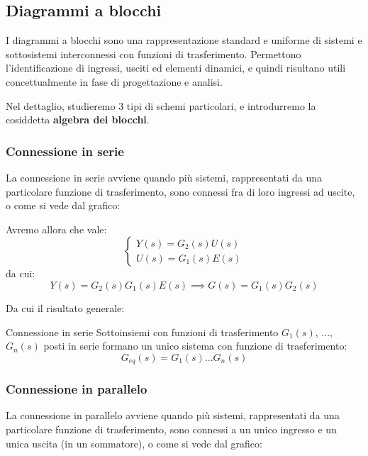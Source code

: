 \documentclass[a4paper,11pt]{article}
\begin{document}
\subsection{Diagrammi a blocchi}
I diagrammi a blocchi sono una rappresentazione standard e uniforme di sistemi e sottosistemi interconnessi con funzioni di trasferimento.
Permettono l'identificazione di ingressi, usciti ed elementi dinamici, e quindi risultano utili concettualmente in fase di progettazione e analisi.

Nel dettaglio, studieremo 3 tipi di schemi particolari, e introdurremo la cosiddetta \textbf{algebra dei blocchi}.

\subsubsection{Connessione in serie}
La connessione in serie avviene quando più sistemi, rappresentati da una particolare funzione di trasferimento, sono connessi fra di loro ingressi ad uscite, o come si vede dal grafico:

\begin{center}
\end{center}

Avremo allora che vale:
\[
	\begin{cases}
	Y(s) = G_2(s) U(s) \\
	U(s) = G_1(s) E(s)
	\end{cases}
\]
da cui:
$$
Y(s) = G_2(s)G_1(s)E(s) \implies G(s) = G_1(s) G_2(s)
$$

Da cui il risultato generale:
\begin{theorem}{Connessione in serie}
	Sottoinsiemi con funzioni di trasferimento $G_1(s)$, $...$, $G_n(s)$ posti in serie formano un unico sistema con funzione di trasferimento:
	$$
		G_{eq}(s) = G_1(s) ... G_n(s)
	$$
\end{theorem}

\subsubsection{Connessione in parallelo}
La connessione in parallelo avviene quando più sistemi, rappresentati da una particolare funzione di trasferimento, sono connessi a un unico ingresso e un unica uscita (in un sommatore), o come si vede dal grafico:
\end{document}
